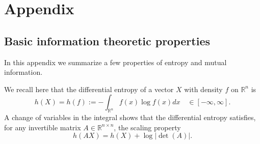 \documentclass{article}
\theoremstyle{plain}
\theoremstyle{definition}
\newcommand{\1}{\mathbf 1}
\begin{document}






 
 
 

 \newpage 
\section*{Appendix}

\subsection*{Basic information theoretic properties}

In this appendix we summarize a few properties of entropy and mutual information. 

We recall here that the differential entropy of a vector $X$ with density $f$ on $\mathbb{R}^n$ is 
$$
h(X) = h(f) := -\int_{\mathbb{R}^n}{f(x)\log{f(x)} dx} \quad \in [-\infty, \infty].
$$
A change of variables in the integral shows that the differential entropy satisfies, for any invertible matrix $A \in \mathbb{R}^{n \times n}$, the scaling property
\begin{equation}
    h(AX) = h(X) + \log{|\det{(A)}|}.
\end{equation}
\end{document}
